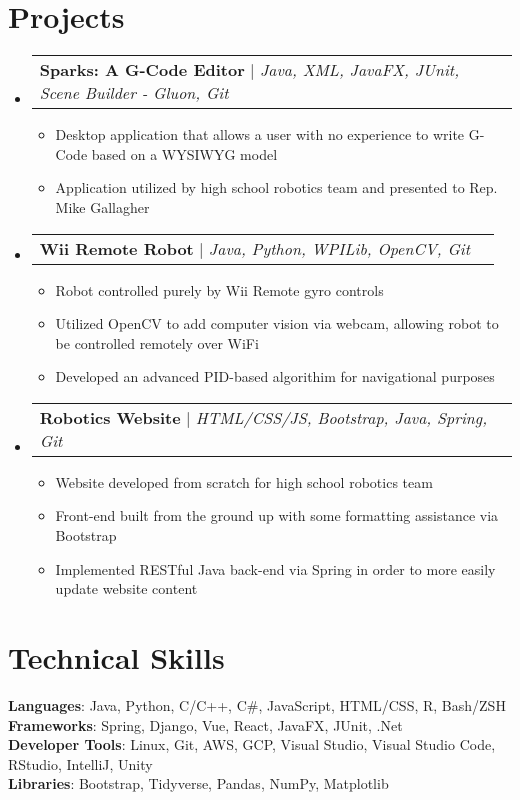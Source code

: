 \documentclass[letterpaper,11pt]{article}
\makeatletter
\newcommand{\resumeItem}[1]{
  \item\small{
    {#1 \vspace{-2pt}}
  }
}
\newcommand{\resumeProjectHeading}[2]{
    \item
    \begin{tabular*}{0.97\textwidth}{l@{\extracolsep{\fill}}r}
      \small#1 & #2 \\
    \end{tabular*}\vspace{-7pt}
}
\newcommand{\resumeSubHeadingListStart}{\begin{itemize}[leftmargin=0.15in, label={}]}
\newcommand{\resumeSubHeadingListEnd}{\end{itemize}}
\newcommand{\resumeItemListStart}{\begin{itemize}}
\newcommand{\resumeItemListEnd}{\end{itemize}\vspace{-5pt}}
\makeatother
\begin{document}
\section{{Projects}}
    \resumeSubHeadingListStart
      \resumeProjectHeading
          {\textbf{Sparks: A G-Code Editor} $|$ \emph{Java, XML, JavaFX, JUnit, Scene Builder - Gluon, Git}}{}
          \resumeItemListStart
            \resumeItem{Desktop application that allows a user with no experience to write G-Code based on a WYSIWYG model}
            \resumeItem{Application utilized by high school robotics team and presented to Rep. Mike Gallagher}
          \resumeItemListEnd
      \resumeProjectHeading
          {\textbf{Wii Remote Robot} $|$ \emph{Java, Python, WPILib, OpenCV, Git}}{}
          \resumeItemListStart
            \resumeItem{Robot controlled purely by Wii Remote gyro controls}
            \resumeItem{Utilized OpenCV to add computer vision via webcam, allowing robot to be controlled remotely over WiFi}
            \resumeItem{Developed an advanced PID-based algorithim for navigational purposes}
          \resumeItemListEnd
                \resumeProjectHeading
          {\textbf{Robotics Website} $|$ \emph{HTML/CSS/JS, Bootstrap, Java, Spring, Git}}{}
          \resumeItemListStart
            \resumeItem{Website developed from scratch for high school robotics team}
            \resumeItem{Front-end built from the ground up with some formatting assistance via Bootstrap}
            \resumeItem{Implemented RESTful Java back-end via Spring in order to more easily update website content}
          \resumeItemListEnd
    \resumeSubHeadingListEnd
%
\section{Technical Skills}
 \begin{itemize}[leftmargin=0.15in, label={}]
    \small{
    \item{
     \textbf{Languages}{: Java, Python, C/C++, C\#, JavaScript, HTML/CSS, R, Bash/ZSH} \\
     \textbf{Frameworks}{: Spring, Django, Vue, React, JavaFX, JUnit, .Net} \\
     \textbf{Developer Tools}{: Linux, Git, AWS, GCP, Visual Studio, Visual Studio Code, RStudio, IntelliJ, Unity} \\
     \textbf{Libraries}{: Bootstrap, Tidyverse, Pandas, NumPy, Matplotlib}
    }}
 \end{itemize}


\end{document}
